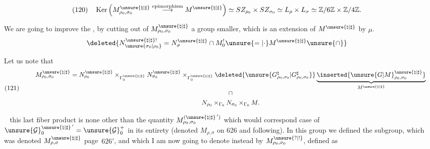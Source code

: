 
\[
(120)\quad
\operatorname{Ker}\left(
M_{\rho_0,\sigma_0}^{\unsure{\natural|\sharp}}
\overset{\text{epimorphism}}{\longrightarrow}M^{\unsure{\natural|\sharp}}
\right)
\simeq SZ_{\rho_0}\times SZ_{\sigma_0}
\simeq L_\rho\times L_\sigma
\simeq \mathbb Z/6\mathbb Z\times\mathbb Z/4\mathbb Z .
\]

We are going to improve  the ,
by cutting out of $M_{\rho_0,\sigma_0}^{\unsure{\natural|\sharp}}$
a group  smaller, which is an extension of
$M^{\unsure{\natural|\sharp}}$ by $\mu$.
\[
\deleted{
N_{\unsure{\sigma_0|\rho_0}}^{\unsure{\natural|\sharp}!}
=N_{\sigma}^{\unsure{\natural|\sharp}}\cap M_0^!
\unsure{=|\cdot}M^{\unsure{\natural|\sharp}}\unsure{\cap}
}
\]

\unsure{(}

Let us note that
\[
(121)\qquad
\begin{array}{c}
M_{\rho_0,\sigma_0}^{\unsure{\natural|\sharp}}
=N_{\rho_0}^{\unsure{\natural|\sharp}}
\times_{\Gamma_0^{\unsure{\natural|\sharp}}}
N_{\sigma_0}^{\unsure{\natural|\sharp}}
\times_{\Gamma_0^{\unsure{\natural|\sharp}}}
\deleted{\unsure{G_{\rho_0,\sigma_0}^{\natural}|G_{\rho_0,\sigma_0}^{\sharp}}}
\underbrace{\inserted{\unsure{G|M}_{\rho_0,\sigma_0}^{\unsure{\natural|\sharp}}}}
 _{M^{\unsure{\natural|\sharp}}}\\[5pt]
\cap\\[3pt]
N_{\rho_0}\times_{\Gamma_0}N_{\sigma_0}\times_{\Gamma_0}M .
\end{array}
\]

\  this last fiber product is none other than the
quantity $M_{\rho_0,\sigma_0}^{(\unsure{\natural|\sharp}\,')}$
which would correspond  case
of $\unsure{\mathcal G}_0^{\unsure{\natural|\sharp}\,'}
=\unsure{\mathcal G}_0^+$ in  its entirety
(denoted $M_{\rho,\sigma}$ on  626 and following).
In this group we defined the subgroup, which was denoted
$M_{\rho,\sigma}^{\unsure{\natural|\sharp}}$
 page\ $626'$,
and which I am now going to denote instead by
$M_{\rho_0,\sigma_0}^{\unsure{?|!}}$, defined as



